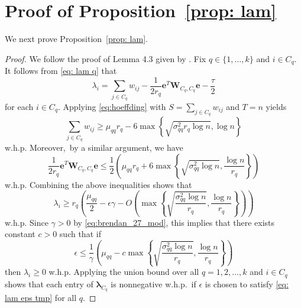 \documentclass[twoside,11pt]{article}
\newcommand{\bs}{\boldsymbol}
\newcommand{\0}{\bs{0}}
\newcommand{\rbra}[1]{\ensuremath{\left( #1 \right)}} %
\newcommand{\bra}[1]{\ensuremath{\left\{ #1 \right\}}} %
\begin{document}
{%
\section{Proof of Proposition~\ref{prop: lam}}
\label{app: lam}
We next prove Proposition~\ref{prop: lam}.
\begin{proof}
We follow the proof of Lemma 4.3 given by \cite{ames2014guaranteed}. Fix $q \in \{1,\dots,k\}$ and $i \in C_q$.
It follows from \eqref{eq: lam q} that
\[
\lambda_i = \sum_{j \in C_q} w_{ij} - \frac{1}{2r_q}\bs{e}^T\bs{W}_{C_q,C_q}\bs{e}-\frac{\tau}{2}
\]
for each \(i \in C_q\).
Applying \eqref{eq:hoeffding} with ${S} = \sum_{j \in C_q} w_{ij}$ and $T = n$ yields
\[
	\sum_{j \in C_q} w_{ij} \geq \mu_{qq} r_q
		- 6 \max \bra{ \sqrt{ \sigma_{qq}^2 r_q \log n }, \log n}
\]
w.h.p. Moreover,~by a similar argument, we have
\[
	\frac{1}{2r_q}\bs{e}^T\bs{W}_{C_q,C_q}\bs{e}
	\leq \frac{1}{2}\left(\mu_{qq} r_q +
	6 \max\bra{ \sqrt{\sigma_{qq}^2 \log n}, \frac{\log n}{r_q} }\right)
\]
w.h.p.
Combining the above inequalities shows that
\[
	\lambda_i \geq	r_q \rbra{ \frac{\mu_{qq}}{2} - \epsilon \gamma
		- O \rbra{ \max \bra{ \sqrt{  \frac{\sigma_{qq}^2 \log n }{r_q} },
			\frac{\log n }{r_q} } } }
\]
w.h.p.
Since $\gamma > 0$ by \eqref{eq:brendan_27_mod}, this implies that
there exists constant $c>0$ such that if
\begin{equation} \label{eq: lam eps tmp}
	\epsilon \leq \frac{1}{\gamma}
	\rbra{ \mu_{qq}  - c \max \bra{ \sqrt{  \frac{\sigma_{qq}^2 \log 		n }{r_q} },
			\frac{\log n }{r_q} } }
\end{equation}
then
$\lambda_i \geq 0$ w.h.p.
Applying the union bound over all \(q =1,2,\dots, k\) and
\(i\in C_q\) shows that each entry of $\bs{\lambda}_{C_q}$ is nonnegative w.h.p.~if \(\epsilon\) is chosen to satisfy \eqref{eq: lam eps tmp} for all $q$.

\end{proof}

}
\end{document}
